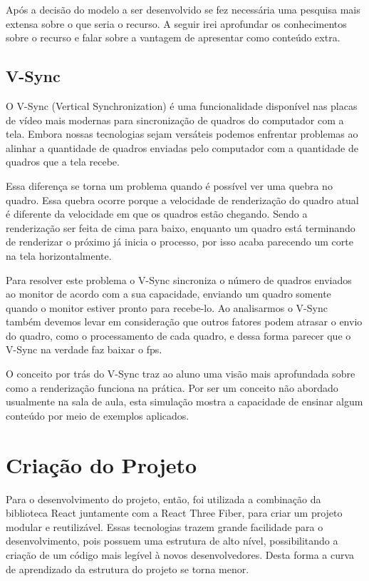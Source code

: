 \documentclass[tcc,capa]{texufpel}
\begin{document}
Após a decisão do modelo a ser desenvolvido se fez necessária uma pesquisa mais extensa sobre o que seria o recurso. A seguir irei aprofundar os conhecimentos sobre o recurso e falar sobre a vantagem de apresentar como conteúdo extra.

\subsection{V-Sync}

O V-Sync (Vertical Synchronization) é uma funcionalidade disponível nas placas de vídeo mais modernas para sincronização de quadros do computador com a tela. Embora nossas tecnologias sejam versáteis podemos enfrentar problemas ao alinhar a quantidade de quadros enviadas pelo computador com a quantidade de quadros que a tela recebe.

Essa diferença se torna um problema quando é possível ver uma quebra no quadro. Essa quebra ocorre porque a velocidade de renderização do quadro atual é diferente da velocidade em que os quadros estão chegando. Sendo a renderização ser feita de cima para baixo, enquanto um quadro está terminando de renderizar o próximo já inicia o processo, por isso acaba parecendo um corte na tela horizontalmente.

Para resolver este problema o V-Sync sincroniza o número de quadros enviados ao monitor de acordo com a sua capacidade, enviando um quadro somente quando o monitor estiver pronto para recebe-lo. Ao analisarmos o V-Sync também devemos levar em consideração que outros fatores podem atrasar o envio do quadro, como o processamento de cada quadro, e dessa forma parecer que o V-Sync na verdade faz baixar o fps. 

O conceito por trás do V-Sync traz ao aluno uma visão mais aprofundada sobre como a renderização funciona na prática. Por ser um conceito não abordado usualmente na sala de aula, esta simulação mostra a capacidade de ensinar algum conteúdo por meio de exemplos aplicados.


\section{Criação do Projeto}

Para o desenvolvimento do projeto, então, foi utilizada a combinação da biblioteca React juntamente com a React Three Fiber, para criar um projeto modular e reutilizável. Essas tecnologias trazem grande facilidade para o desenvolvimento, pois possuem uma estrutura de alto nível, possibilitando a criação de um código mais legível à novos desenvolvedores. Desta forma a curva de aprendizado da estrutura do projeto se torna menor.
\end{document}
